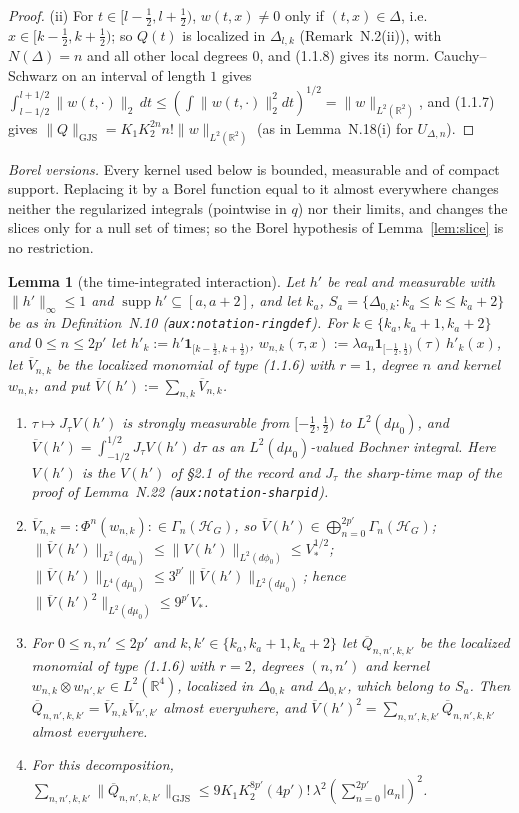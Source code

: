 \documentclass[11pt,a4paper]{article}
\newcommand{\R}{\mathbb{R}}
\newcommand{\HH}{\mathcal{H}}
\DeclareMathOperator{\supp}{supp}
\newcommand{\GJS}[1]{\lVert #1\rVert_{\mathrm{GJS}}}
\newcommand{\dmu}{d\mu_0}
\newcommand{\dphi}{d\phi_0}
\newcommand{\Vb}{\overline V}                 %
\theoremstyle{plain}
\newtheorem{tlemma}{Lemma}
\theoremstyle{definition}
\begin{document}
\begin{proof}
(ii) For $t\in[l-\frac12,l+\frac12)$, $w(t,x)\ne0$ only if $(t,x)\in\Delta$, i.e.\
$x\in[k-\frac12,k+\frac12)$; so $Q(t)$ is localized in $\Delta_{l,k}$ (Remark~N.2(ii)), with
$N(\Delta)=n$ and all other local degrees $0$, and (1.1.8) gives its norm.  Cauchy--Schwarz on
an interval of length $1$ gives $\int_{l-1/2}^{l+1/2}\|w(t,\cdot)\|_2\,dt\le
(\int\|w(t,\cdot)\|_2^2dt)^{1/2}=\|w\|_{L^2(\R^2)}$, and (1.1.7) gives
$\GJS{Q}=K_1K_2^{2n}n!\|w\|_{L^2(\R^2)}$ (as in Lemma~N.18(i) for $U_{\Delta,n}$).
\end{proof}

\emph{Borel versions.}  Every kernel used below is bounded, measurable and of compact support.
Replacing it by a Borel function equal to it almost everywhere changes neither the regularized
integrals (pointwise in $q$) nor their limits, and changes the slices only for a null set of
times; so the Borel hypothesis of Lemma~\ref{lem:slice} is no restriction.

\begin{tlemma}[the time-integrated interaction]\label{lem:Vbar}
Let $h'$ be real and measurable with $\|h'\|_\infty\le1$ and $\supp h'\subseteq[a,a+2]$, and let
$k_a$, $S_a=\{\Delta_{0,k}:k_a\le k\le k_a+2\}$ be as in Definition~N.10
(\texttt{aux:notation-ringdef}).  For $k\in\{k_a,k_a+1,k_a+2\}$ and $0\le n\le2p'$ let
$h'_k:=h'\mathbf 1_{[k-\frac12,k+\frac12)}$, $w_{n,k}(\tau,x):=\lambda a_n\mathbf
1_{[-\frac12,\frac12)}(\tau)\,h'_k(x)$, let $\Vb_{n,k}$ be the localized monomial of type (1.1.6)
with $r=1$, degree $n$ and kernel $w_{n,k}$, and put $\Vb(h'):=\sum_{n,k}\Vb_{n,k}$.
\begin{enumerate}
\item[\rm(i)] $\tau\mapsto J_\tau V(h')$ is strongly measurable from $[-\frac12,\frac12)$ to
$L^2(\dmu)$, and $\Vb(h')=\int_{-1/2}^{1/2}J_\tau V(h')\,d\tau$ as an $L^2(\dmu)$-valued Bochner
integral.  Here $V(h')$ is the $V(h')$ of \S2.1 of the record and $J_\tau$ the sharp-time map of
the proof of Lemma~N.22 (\texttt{aux:notation-sharpid}).
\item[\rm(ii)] $\Vb_{n,k}={:}\Phi^n(w_{n,k}){:}\in\Gamma_n(\HH_G)$, so
$\Vb(h')\in\bigoplus_{n=0}^{2p'}\Gamma_n(\HH_G)$;
$\|\Vb(h')\|_{L^2(\dmu)}\le\|V(h')\|_{L^2(\dphi)}\le V_*^{1/2}$;
$\|\Vb(h')\|_{L^4(\dmu)}\le3^{p'}\|\Vb(h')\|_{L^2(\dmu)}$; hence
$\|\Vb(h')^2\|_{L^2(\dmu)}\le9^{p'}V_*$.
\item[\rm(iii)] For $0\le n,n'\le2p'$ and $k,k'\in\{k_a,k_a+1,k_a+2\}$ let $\overline
Q_{n,n',k,k'}$ be the localized monomial of type (1.1.6) with $r=2$, degrees $(n,n')$ and
kernel $w_{n,k}\otimes w_{n',k'}\in L^2(\R^4)$, localized in $\Delta_{0,k}$ and $\Delta_{0,k'}$,
which belong to $S_a$.  Then $\overline Q_{n,n',k,k'}=\Vb_{n,k}\Vb_{n',k'}$ almost everywhere,
and $\Vb(h')^2=\sum_{n,n',k,k'}\overline Q_{n,n',k,k'}$ almost everywhere.
\item[\rm(iv)] For this decomposition,
$\sum_{n,n',k,k'}\GJS{\overline Q_{n,n',k,k'}}\le9K_1K_2^{8p'}(4p')!\,\lambda^2(\sum_{n=0}^{2p'}|a_n|)^2$.
\end{enumerate}
\end{tlemma}
\end{document}
